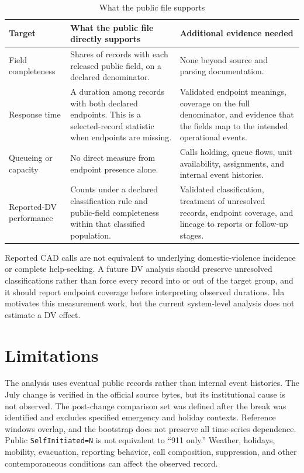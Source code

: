 \documentclass[11pt]{article}
\begin{document}
\begin{table}[t]
\centering
\caption{What the public file supports}
\label{tab:implications}
\begin{tabularx}{\textwidth}{@{}p{}p{}X@{}}
\toprule
Target & What the public file directly supports & Additional evidence needed \\
\midrule
Field completeness &
Shares of records with each released public field, on a declared denominator. &
None beyond source and parsing documentation. \\
Response time &
A duration among records with both declared endpoints. This is a selected-record statistic when endpoints are missing. &
Validated endpoint meanings, coverage on the full denominator, and evidence that the fields map to the intended operational events. \\
Queueing or capacity &
No direct measure from endpoint presence alone. &
Calls holding, queue flows, unit availability, assignments, and internal event histories. \\
Reported-DV performance &
Counts under a declared classification rule and public-field completeness within that classified population. &
Validated classification, treatment of unresolved records, endpoint coverage, and lineage to reports or follow-up stages. \\
\bottomrule
\end{tabularx}
\end{table}

Reported CAD calls are not equivalent to underlying domestic-violence incidence or complete help-seeking. A future DV analysis should preserve unresolved classifications rather than force every record into or out of the target group, and it should report endpoint coverage before interpreting observed durations. Ida motivates this measurement work, but the current system-level analysis does not estimate a DV effect.

\section{Limitations}

The analysis uses eventual public records rather than internal event histories. The July change is verified in the official source bytes, but its institutional cause is not observed. The post-change comparison set was defined after the break was identified and excludes specified emergency and holiday contexts. Reference windows overlap, and the bootstrap does not preserve all time-series dependence. Public \texttt{SelfInitiated=N} is not equivalent to ``911 only.'' Weather, holidays, mobility, evacuation, reporting behavior, call composition, suppression, and other contemporaneous conditions can affect the observed record.
\end{document}
